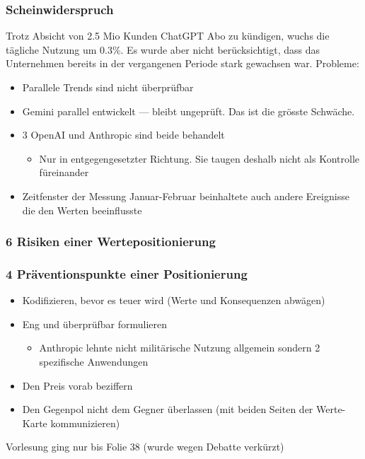 \pagebreak
\subsubsection{Scheinwiderspruch}

Trotz Absicht von 2.5 Mio Kunden ChatGPT Abo zu kündigen, wuchs die tägliche Nutzung um 0.3\%. Es wurde aber nicht berücksichtigt, dass das Unternehmen bereits in der vergangenen Periode stark gewachsen war.
Probleme: 
\begin{itemize}
    \item Parallele Trends sind nicht überprüfbar
\item Gemini parallel entwickelt — bleibt ungeprüft. Das ist die grösste Schwäche.
\item 3 OpenAI und Anthropic sind beide behandelt
\begin{itemize}
\item Nur in entgegengesetzter Richtung. Sie taugen deshalb nicht als Kontrolle füreinander
\end{itemize}
    \item Zeitfenster der Messung Januar-Februar beinhaltete auch andere Ereignisse die den Werten beeinflusste
\end{itemize}


\subsubsection{6 Risiken einer Wertepositionierung}

\subsubsection{4 Präventionspunkte einer Positionierung}
\begin{itemize}
    \item Kodifizieren, bevor es teuer wird (Werte und Konsequenzen abwägen)
    \item Eng und überprüfbar formulieren
    \begin{itemize}
        \item Anthropic lehnte nicht militärische Nutzung allgemein sondern 2 spezifische Anwendungen
    \end{itemize}
    \item Den Preis vorab beziffern
    \item Den Gegenpol nicht dem Gegner überlassen (mit beiden Seiten der Werte-Karte kommunizieren)
\end{itemize}

Vorlesung ging nur bis Folie 38 (wurde wegen Debatte verkürzt)